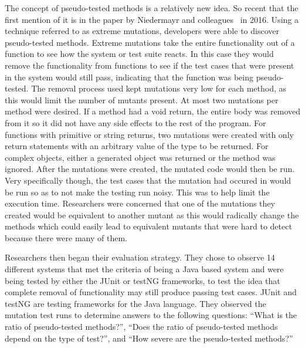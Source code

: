 The concept of pseudo-tested methods is a relatively new idea. So recent that the first mention of it is in the paper by Niedermayr and colleagues~\cite{niedermayr2016will} in 2016. Using a technique referred to as extreme mutations, developers were able to discover pseudo-tested methods.
Extreme mutations take the entire functionality out of a function to see how the system or test suite reacts. In this case they would remove the functionality from functions to see if the test cases that were present in the system would still pass, indicating that the function was being pseudo-tested.
The removal process used kept mutations very low for each method, as this would limit the number of mutants present. At most two mutations per method were desired. If a method had a void return, the entire body was removed from it so it did not have any side effects to the rest of the program. For functions with primitive or string returns, two mutations were created with only return statements with an arbitrary value of the type to be returned. For complex objects, either a generated object was returned or the method was ignored.
After the mutations were created, the mutated code would then be run. Very specifically though, the test cases that the mutation had occured in would be run so as to not make the testing run noisy. This was to help limit the execution time. Researchers were concerned that one of the mutations they created would be equivalent to another mutant as this would radically change the methods which could easily lead to equivalent mutants that were hard to detect because there were many of them\cite{niedermayr2016will}.

Researchers then began their evaluation strategy. They chose to observe 14 different systems that met the criteria of being a Java based system and were being tested by either the JUnit or testNG frameworks, to test the idea that complete removal of functionality may still produce passing test cases. JUnit and testNG are testing frameworks for the Java language. They observed the mutation test runs to determine answers to the following questions: ``What is the ratio of pseudo-tested methods?'', ``Does the ratio of pseudo-tested methods depend on the type of test?'', and ``How severe are the pseudo-tested methods?''

